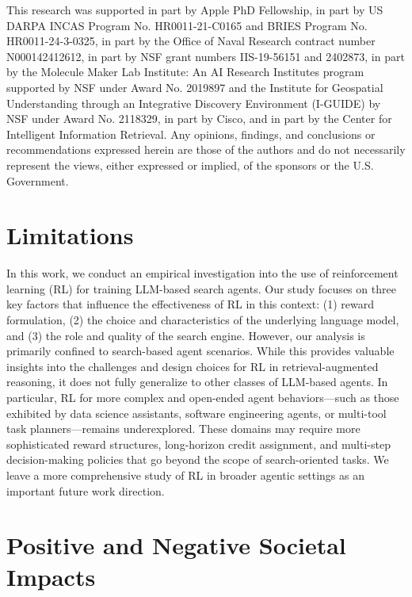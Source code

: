 \begin{ack}
This research was supported in part by Apple PhD Fellowship, in part by US DARPA INCAS Program No. HR0011-21-C0165 and BRIES Program No. HR0011-24-3-0325, in part by the Office of Naval Research contract number N000142412612, in part by NSF grant numbers IIS-19-56151 and 2402873, in part by the Molecule Maker Lab Institute: An AI Research Institutes program supported by NSF under Award No. 2019897 and the Institute for Geospatial Understanding through an Integrative Discovery Environment (I-GUIDE) by NSF under Award No. 2118329, in part by Cisco, and in part by the Center for Intelligent Information Retrieval. Any opinions, findings, and conclusions or recommendations expressed herein are those of the authors and do not necessarily represent the views, either expressed or implied, of the sponsors or the U.S. Government.
\end{ack}




\newpage
\appendix

\section{Limitations}\label{apx:sec:limitation}

In this work, we conduct an empirical investigation into the use of reinforcement learning (RL) for training LLM-based search agents. 
Our study focuses on three key factors that influence the effectiveness of RL in this context: (1) reward formulation, (2) the choice and characteristics of the underlying language model, and (3) the role and quality of the search engine.
However, our analysis is primarily confined to search-based agent scenarios. 
While this provides valuable insights into the challenges and design choices for RL in retrieval-augmented reasoning, it does not fully generalize to other classes of LLM-based agents. 
In particular, RL for more complex and open-ended agent behaviors---such as those exhibited by data science assistants, software engineering agents, or multi-tool task planners—remains underexplored. 
These domains may require more sophisticated reward structures, long-horizon credit assignment, and multi-step decision-making policies that go beyond the scope of search-oriented tasks.
We leave a more comprehensive study of RL in broader agentic settings as an important future work direction.

\section{Positive and Negative Societal Impacts}\label{apx:sec-impact}

